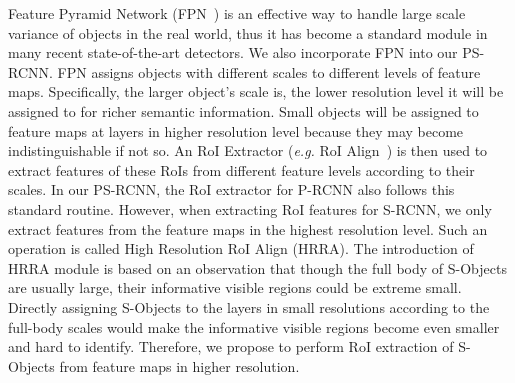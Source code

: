 \documentclass{article}
\begin{document}
Feature Pyramid Network (FPN~\cite{Lin2016Feature}) is an effective way to handle large scale variance of objects in the real world, thus it has become a standard module in many recent state-of-the-art detectors. We also incorporate FPN into our PS-RCNN. FPN assigns objects with different scales to different levels of feature maps. Specifically, the larger object's scale is, the lower resolution level it will be assigned to for richer semantic information. Small objects will be assigned to feature maps at layers in higher resolution level because they may become indistinguishable if not so. An RoI Extractor (\emph{e.g.} RoI Align~\cite{He2017Mask}) is then used to extract features of these RoIs from different feature levels according to their scales. In our PS-RCNN, the RoI extractor for P-RCNN also follows this standard routine. However, when extracting RoI features for S-RCNN, we only extract features from the feature maps in the highest resolution level. Such an operation is called High Resolution RoI Align (HRRA). The introduction of HRRA module is based on an observation that though the full body of S-Objects are usually large, their informative visible regions could be extreme small. Directly assigning S-Objects to the layers in small resolutions according to the full-body scales would make the informative visible regions become even smaller and hard to identify. Therefore, we propose to perform RoI extraction of S-Objects from feature maps in higher resolution.
\end{document}
